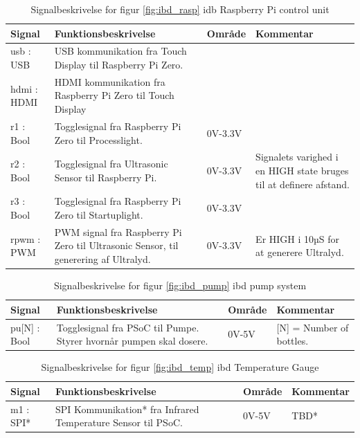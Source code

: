\begin{table}[H] 
	\centering 
	\begin{tabular}{|p{2cm}|p{6cm}|p{2cm}|p{3cm}|}
		\hline
\textbf{Signal} & \textbf{Funktionsbeskrivelse}  & \textbf{Område} &  \textbf{Kommentar}  \\ \hline
usb : USB & USB kommunikation fra Touch Display til Raspberry Pi Zero. & \cellcolor{gray} &  \\ \hline
hdmi : HDMI & HDMI kommunikation fra Raspberry Pi Zero til Touch Display & \cellcolor{gray} &  \\ \hline
r1 : Bool & Togglesignal fra Raspberry Pi Zero til Processlight. & 0V-3.3V &  \\ \hline
r2 : Bool & Togglesignal fra Ultrasonic Sensor til Raspberry Pi. & 0V-3.3V & Signalets varighed i en HIGH state bruges til at definere afstand. \\ \hline
r3 : Bool & Togglesignal fra Raspberry Pi Zero til Startuplight. & 0V-3.3V &  \\ \hline 
rpwm : PWM & PWM signal fra Raspberry Pi Zero til Ultrasonic Sensor, til generering af Ultralyd. & 0V-3.3V & Er HIGH i 10µS for at generere Ultralyd. \\ \hline
	\end{tabular}
	\caption{Signalbeskrivelse for figur \ref{fig:ibd_rasp} idb Raspberry Pi control unit}
	\label{tab:signalbeskrivelse_rasp}
\end{table}
\FloatBarrier

\begin{table}[H] 
	\centering 
	\begin{tabular}{|p{2cm}|p{6cm}|p{2cm}|p{3cm}|}
		\hline
\textbf{Signal} & \textbf{Funktionsbeskrivelse}  & \textbf{Område} &  \textbf{Kommentar}  \\ \hline
pu[N] : Bool & Togglesignal fra PSoC til Pumpe. Styrer hvornår pumpen skal dosere. & 0V-5V & [N] = Number of bottles.  \\ \hline
	\end{tabular}
	\caption{Signalbeskrivelse for figur \ref{fig:ibd_pump} ibd pump system}
	\label{tab:signalbeskrivelse_pump}
\end{table}
\FloatBarrier

\begin{table}[H] 
	\centering 
	\begin{tabular}{|p{2cm}|p{6cm}|p{2cm}|p{3cm}|}
		\hline
\textbf{Signal} & \textbf{Funktionsbeskrivelse}  & \textbf{Område} &  \textbf{Kommentar}  \\ \hline
m1 : SPI* & SPI Kommunikation* fra Infrared Temperature Sensor til PSoC. & 0V-5V &  TBD* \\ \hline
	\end{tabular}
	\caption{Signalbeskrivelse for figur \ref{fig:ibd_temp} ibd Temperature Gauge}
	\label{tab:signalbeskrivelse_temp}
\end{table}
\FloatBarrier

